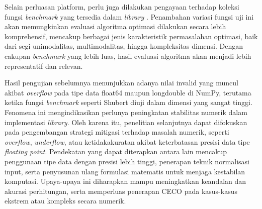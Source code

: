 Selain perluasan platform, perlu juga dilakukan pengayaan terhadap koleksi fungsi \textit{benchmark} yang tersedia dalam \textit{library} . Penambahan variasi fungsi uji ini akan memungkinkan evaluasi algoritma optimasi dilakukan secara lebih komprehensif, mencakup berbagai jenis karakteristik permasalahan optimasi, baik dari segi unimodalitas, multimodalitas, hingga kompleksitas dimensi. Dengan cakupan \textit{benchmark} yang lebih luas, hasil evaluasi algoritma akan menjadi lebih representatif dan relevan.

Hasil pengujian sebelumnya menunjukkan adanya nilai invalid yang muncul akibat \textit{overflow} pada tipe data float64 maupun longdouble di NumPy, terutama ketika fungsi \textit{benchmark} seperti Shubert diuji dalam dimensi yang sangat tinggi. Fenomena ini mengindikasikan perlunya peningkatan stabilitas numerik dalam implementasi \textit{library}. Oleh karena itu, penelitian selanjutnya dapat difokuskan pada pengembangan strategi mitigasi terhadap masalah numerik, seperti \textit{overflow}, \textit{underflow}, atau ketidakakuratan akibat keterbatasan presisi data tipe \textit{floating point}. Pendekatan yang dapat diterapkan antara lain mencakup penggunaan tipe data dengan presisi lebih tinggi, penerapan teknik normalisasi input, serta penyusunan ulang formulasi matematis untuk menjaga kestabilan komputasi. Upaya-upaya ini diharapkan mampu meningkatkan keandalan dan akurasi perhitungan, serta memperluas penerapan CECO pada kasus-kasus ekstrem atau kompleks secara numerik.
